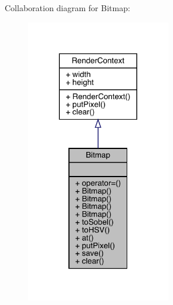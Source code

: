 Collaboration diagram for Bitmap\+:\nopagebreak
\begin{figure}[H]
\begin{center}
\leavevmode
\includegraphics[width=179pt]{class_bitmap__coll__graph}
\end{center}
\end{figure}
